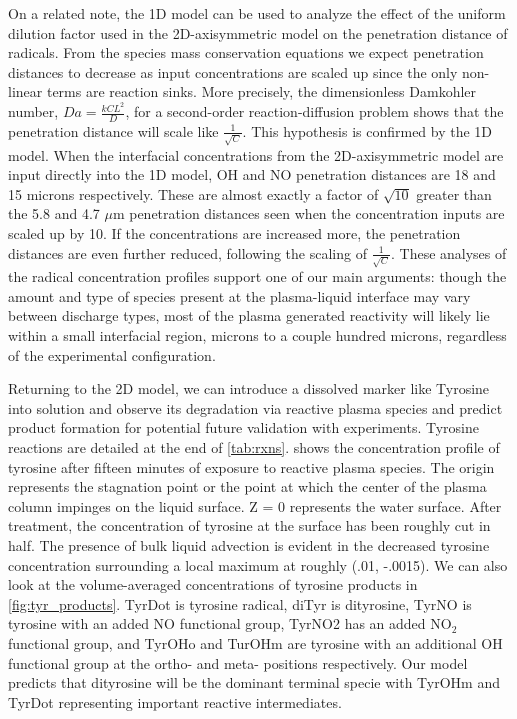 On a related note, the 1D model can be used to analyze the effect of the uniform dilution factor used in the 2D-axisymmetric model on the penetration distance of radicals. From the species mass conservation equations we expect penetration distances to decrease as input concentrations are scaled up since the only non-linear terms are reaction sinks. More precisely, the dimensionless Damkohler number, $Da=\frac{kCL^2}{D}$, for a second-order reaction-diffusion problem shows that the penetration distance will scale like $\frac{1}{\sqrt{C}}$. \cite[p. 55]{deen1998analysis} This hypothesis is confirmed by the 1D model. When the interfacial concentrations from the 2D-axisymmetric model are input directly into the 1D model, OH and NO penetration distances are 18 and 15 microns respectively. These are almost exactly a factor of $\sqrt{10}$ greater than the 5.8 and 4.7 $\mu$m penetration distances seen when the concentration inputs are scaled up by 10. If the concentrations are increased more, the penetration distances are even further reduced, following the scaling of $\frac{1}{\sqrt{C}}$. These analyses of the radical concentration profiles support one of our main arguments: though the amount and type of species present at the plasma-liquid interface may vary between discharge types, most of the plasma generated reactivity will likely lie within a small interfacial region, microns to a couple hundred microns, regardless of the experimental configuration.

Returning to the 2D model, we can introduce a dissolved marker like Tyrosine into solution and observe its degradation via reactive plasma species and predict product formation for potential future validation with experiments. Tyrosine reactions are detailed at the end of \cref{tab:rxns}.  shows the concentration profile of tyrosine after fifteen minutes of exposure to reactive plasma species. The origin represents the stagnation point or the point at which the center of the plasma column impinges on the liquid surface. Z = 0 represents the water surface. After treatment, the concentration of tyrosine at the surface has been roughly cut in half. The presence of bulk liquid advection is evident in the decreased tyrosine concentration surrounding a local maximum at roughly (.01, -.0015). We can also look at the volume-averaged concentrations of tyrosine products in \cref{fig:tyr_products}. TyrDot is tyrosine radical, diTyr is dityrosine, TyrNO is tyrosine with an added NO functional group, TyrNO2 has an added NO$_2$ functional group, and TyrOHo and TurOHm are tyrosine with an additional OH functional group at the ortho- and meta- positions respectively. Our model predicts that dityrosine will be the dominant terminal specie with TyrOHm and TyrDot representing important reactive intermediates.

